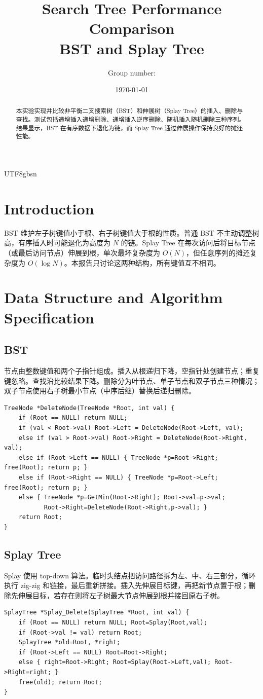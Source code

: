 \documentclass{article}
\begin{document}
\begin{CJK*}{UTF8}{gbsn}
\title{Search Tree Performance Comparison\\BST and Splay Tree}
\author{Group number: \underline{\hspace{3cm}}}\date{\today}\maketitle
\begin{abstract}
本实验实现并比较非平衡二叉搜索树（BST）和伸展树（Splay Tree）的插入、删除与查找。测试包括递增插入递增删除、递增插入逆序删除、随机插入随机删除三种序列。结果显示，BST 在有序数据下退化为链，而 Splay Tree 通过伸展操作保持良好的摊还性能。
\end{abstract}
\section{Introduction}
BST 维护左子树键值小于根、右子树键值大于根的性质。普通 BST 不主动调整树高，有序插入时可能退化为高度为 $N$ 的链。Splay Tree 在每次访问后将目标节点（或最后访问节点）伸展到根，单次最坏复杂度为 $O(N)$，但任意序列的摊还复杂度为 $O(\log N)$。本报告只讨论这两种结构，所有键值互不相同。
\section{Data Structure and Algorithm Specification}
\subsection{BST}
节点由整数键值和两个子指针组成。插入从根递归下降，空指针处创建节点；重复键忽略。查找沿比较结果下降。删除分为叶节点、单子节点和双子节点三种情况；双子节点使用右子树最小节点（中序后继）替换后递归删除。
\begin{lstlisting}
TreeNode *DeleteNode(TreeNode *Root, int val) {
    if (Root == NULL) return NULL;
    if (val < Root->val) Root->Left = DeleteNode(Root->Left, val);
    else if (val > Root->val) Root->Right = DeleteNode(Root->Right, val);
    else if (Root->Left == NULL) { TreeNode *p=Root->Right; free(Root); return p; }
    else if (Root->Right == NULL) { TreeNode *p=Root->Left; free(Root); return p; }
    else { TreeNode *p=GetMin(Root->Right); Root->val=p->val;
           Root->Right=DeleteNode(Root->Right,p->val); }
    return Root;
}
\end{lstlisting}
\subsection{Splay Tree}
Splay 使用 top-down 算法。临时头结点把访问路径拆为左、中、右三部分，循环执行 zig-zig 和链接，最后重新拼接。插入先伸展目标键，再把新节点置于根；删除先伸展目标，若存在则将左子树最大节点伸展到根并接回原右子树。
\begin{lstlisting}
SplayTree *Splay_Delete(SplayTree *Root, int val) {
    if (Root == NULL) return NULL; Root=Splay(Root,val);
    if (Root->val != val) return Root;
    SplayTree *old=Root, *right;
    if (Root->Left == NULL) Root=Root->Right;
    else { right=Root->Right; Root=Splay(Root->Left,val); Root->Right=right; }
    free(old); return Root;
}
\end{lstlisting}

\end{CJK*}
\end{document}
